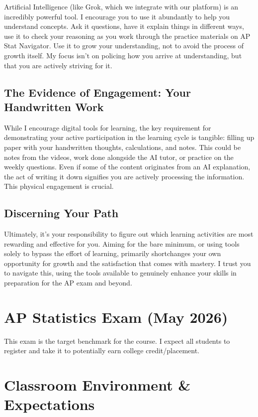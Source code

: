 \documentclass[11pt]{article}
\begin{document}
Artificial Intelligence (like Grok, which we integrate with our platform) is an incredibly powerful tool. I encourage you to use it abundantly to help you understand concepts. Ask it questions, have it explain things in different ways, use it to check your reasoning as you work through the practice materials on AP Stat Navigator. Use it to grow your understanding, not to avoid the process of growth itself. My focus isn't on policing how you arrive at understanding, but that you are actively striving for it.

\subsection{The Evidence of Engagement: Your Handwritten Work}

While I encourage digital tools for learning, the key requirement for demonstrating your active participation in the learning cycle is tangible: filling up paper with your handwritten thoughts, calculations, and notes. This could be notes from the videos, work done alongside the AI tutor, or practice on the weekly questions. Even if some of the content originates from an AI explanation, the act of writing it down signifies you are actively processing the information. This physical engagement is crucial.

\subsection{Discerning Your Path}

Ultimately, it's your responsibility to figure out which learning activities are most rewarding and effective for you. Aiming for the bare minimum, or using tools solely to bypass the effort of learning, primarily shortchanges your own opportunity for growth and the satisfaction that comes with mastery. I trust you to navigate this, using the tools available to genuinely enhance your skills in preparation for the AP exam and beyond.

\section{AP Statistics Exam (May 2026)}

This exam is the target benchmark for the course. I expect all students to register and take it to potentially earn college credit/placement.

\section{Classroom Environment \& Expectations}
\end{document}
